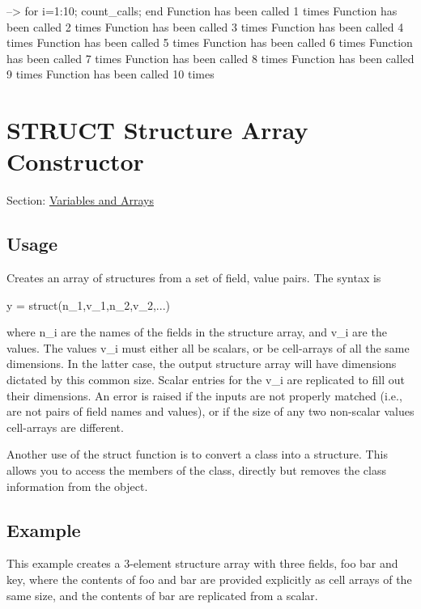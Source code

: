 \begin{DoxyVerbInclude}
--> for i=1:10; count_calls; end
Function has been called 1 times
Function has been called 2 times
Function has been called 3 times
Function has been called 4 times
Function has been called 5 times
Function has been called 6 times
Function has been called 7 times
Function has been called 8 times
Function has been called 9 times
Function has been called 10 times
\end{DoxyVerbInclude}
 \hypertarget{variables_struct}{}\section{S\-T\-R\-U\-C\-T Structure Array Constructor}\label{variables_struct}
Section\-: \hyperlink{sec_variables}{Variables and Arrays} \hypertarget{vtkwidgets_vtkxyplotwidget_Usage}{}\subsection{Usage}\label{vtkwidgets_vtkxyplotwidget_Usage}
Creates an array of structures from a set of field, value pairs. The syntax is \begin{DoxyVerb}   y = struct(n_1,v_1,n_2,v_2,...)
\end{DoxyVerb}
 where {\ttfamily n\-\_\-i} are the names of the fields in the structure array, and {\ttfamily v\-\_\-i} are the values. The values {\ttfamily v\-\_\-i} must either all be scalars, or be cell-\/arrays of all the same dimensions. In the latter case, the output structure array will have dimensions dictated by this common size. Scalar entries for the {\ttfamily v\-\_\-i} are replicated to fill out their dimensions. An error is raised if the inputs are not properly matched (i.\-e., are not pairs of field names and values), or if the size of any two non-\/scalar values cell-\/arrays are different.

Another use of the {\ttfamily struct} function is to convert a class into a structure. This allows you to access the members of the class, directly but removes the class information from the object.\hypertarget{variables_struct_Example}{}\subsection{Example}\label{variables_struct_Example}
This example creates a 3-\/element structure array with three fields, {\ttfamily foo} {\ttfamily bar} and {\ttfamily key}, where the contents of {\ttfamily foo} and {\ttfamily bar} are provided explicitly as cell arrays of the same size, and the contents of {\ttfamily bar} are replicated from a scalar.


